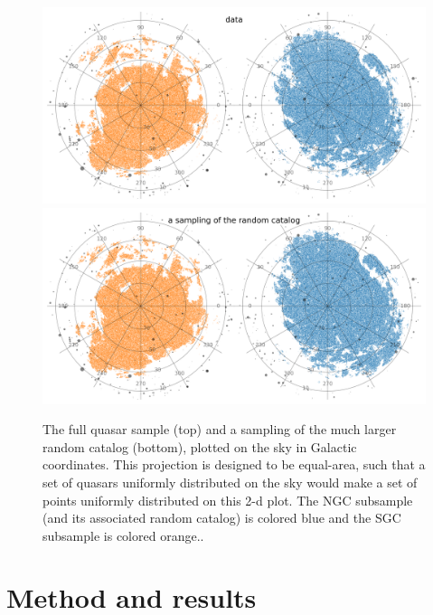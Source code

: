 \documentclass[modern]{aastex631}
\newlength{\widefigurewidth}
\newlength{\figurewidth}
\begin{document}
\begin{figure}[t!]
  \begin{mdframed}
  \color{captiongray}
  \begin{center}
    \includegraphics[width=\widefigurewidth]{notebooks/lb_better.png}\\
    \includegraphics[width=\widefigurewidth]{notebooks/lb_random_better.png}
  \end{center}
    \caption{The full quasar sample (top) and a sampling of the much larger random catalog (bottom), plotted on the sky in Galactic coordinates.
    This projection is designed to be equal-area, such that a set of quasars uniformly distributed on the sky would make a set of points uniformly distributed on this 2-d plot.
    The NGC subsample (and its associated random catalog) is colored blue and the SGC subsample is colored orange.\label{fig:lb}.}
  \end{mdframed}
\end{figure}

\section{Method and results}
\end{document}
